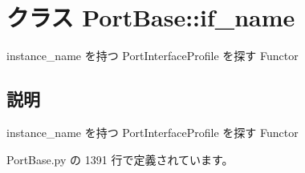 \section{クラス PortBase::if\_\-name}
\label{classsource__py_1_1_port_base_1_1_port_base_1_1if__name}
instance\_\-name を持つ PortInterfaceProfile を探す Functor  




\subsection{説明}
instance\_\-name を持つ PortInterfaceProfile を探す Functor 

 PortBase.py の 1391 行で定義されています。